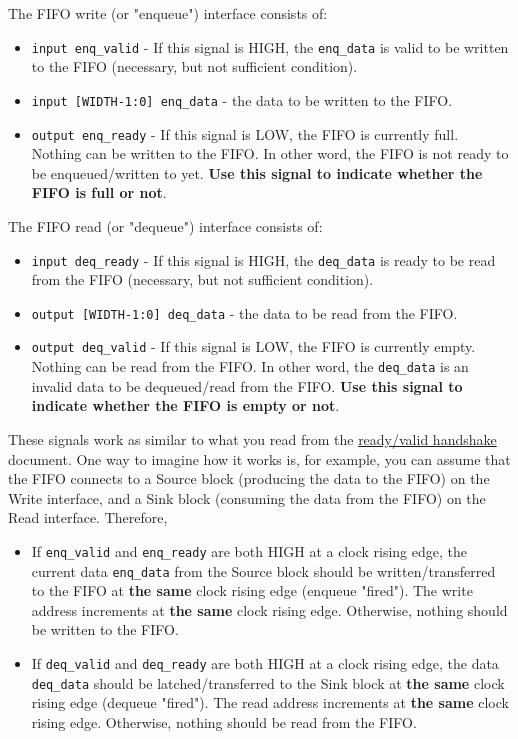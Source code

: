 \documentclass[11pt]{article}
\begin{document}
The FIFO write (or "enqueue") interface consists of:
\begin{itemize}
    \item \verb|input enq_valid| - If this signal is HIGH, the \verb|enq_data| is valid to be written to the FIFO (necessary, but not sufficient condition).
    \item \verb|input [WIDTH-1:0] enq_data| - the data to be written to the FIFO.
    \item \verb|output enq_ready| - If this signal is LOW, the FIFO is currently full. Nothing can be written to the FIFO. In other word, the FIFO is not ready to be enqueued/written to yet. \textbf{Use this signal to indicate whether the FIFO is full or not}.
\end{itemize}

The FIFO read (or "dequeue") interface consists of:
\begin{itemize}
    \item \verb|input deq_ready| - If this signal is HIGH, the \verb|deq_data| is ready to be read from the FIFO (necessary, but not sufficient condition).
    \item \verb|output [WIDTH-1:0] deq_data| - the data to be read from the FIFO.
    \item \verb|output deq_valid| - If this signal is LOW, the FIFO is currently empty. Nothing can be read from the FIFO. In other word, the \verb|deq_data| is an invalid data to be dequeued/read from the FIFO. \textbf{Use this signal to indicate whether the FIFO is empty or not}.
\end{itemize}

These signals work as similar to what you read from the \href{http://inst.eecs.berkeley.edu/~eecs151/sp20/files/verilog/ready_valid_interface.pdf}{ready/valid handshake} document. One way to imagine how it works is, for example, you can assume that the FIFO connects to a Source block (producing the data to the FIFO) on the Write interface, and a Sink block (consuming the data from the FIFO) on the Read interface. Therefore,

\begin{itemize}
    \item If \verb|enq_valid| and \verb|enq_ready| are both HIGH at a clock rising edge, the current data \verb|enq_data| from the Source block should be written/transferred to the FIFO at \textbf{the same} clock rising edge (enqueue "fired"). The write address increments at \textbf{the same} clock rising edge. Otherwise, nothing should be written to the FIFO.
    \item If \verb|deq_valid| and \verb|deq_ready| are both HIGH at a clock rising edge, the data \verb|deq_data| should be latched/transferred to the Sink block at \textbf{the same} clock rising edge (dequeue "fired"). The read address increments at \textbf{the same} clock rising edge. Otherwise, nothing should be read from the FIFO.
\end{itemize}
\end{document}
